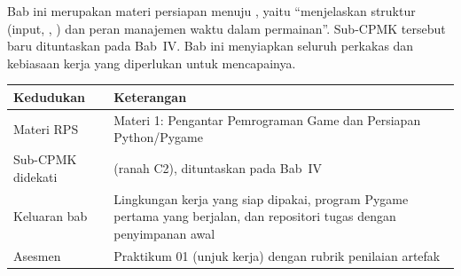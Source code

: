 \begin{subcpmkbox}
Bab ini merupakan materi persiapan menuju , yaitu ``menjelaskan
struktur  (input, , ) dan
peran manajemen waktu dalam permainan''. Sub-CPMK tersebut baru dituntaskan
pada Bab~IV. Bab ini menyiapkan seluruh perkakas dan kebiasaan kerja yang
diperlukan untuk mencapainya.

\vspace{0.4em}
\begin{tabularx}{\textwidth}{@{}L{3.0cm} Y@{}}
\toprule
\headrow \textbf{Kedudukan} & \textbf{Keterangan} \\
\midrule
Materi RPS & Materi 1: Pengantar Pemrograman Game dan Persiapan Python/Pygame \\
\addlinespace
Sub-CPMK didekati &  (ranah C2), dituntaskan pada Bab~IV \\
\addlinespace
Keluaran bab & Lingkungan kerja yang siap dipakai, program Pygame pertama yang
berjalan, dan repositori tugas dengan penyimpanan awal \\
\addlinespace
Asesmen & Praktikum 01 (unjuk kerja) dengan rubrik penilaian artefak \\
\bottomrule
\end{tabularx}
\end{subcpmkbox}
